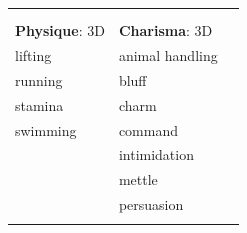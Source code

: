 \documentclass[10pt]{article}
\begin{document}
\begin{table}
\begin{tabular}{m{156pt} m{156pt} m{156pt}}
 \hrulefill &  \hrulefill &  \hrulefill \\

 \hrulefill &  \hrulefill &  \hrulefill \\


\textbf{Physique}: 3D \hrulefill & \textbf{Charisma}: 3D \hrulefill     &  \hrulefill \\

lifting              \hrulefill & animal handling      \hrulefill &  \hrulefill \\

running              \hrulefill & bluff                \hrulefill &  \hrulefill \\

stamina              \hrulefill & charm                \hrulefill &  \hrulefill \\

swimming             \hrulefill & command              \hrulefill &  \hrulefill \\

 \hrulefill & intimidation         \hrulefill &  \hrulefill \\

 \hrulefill & mettle               \hrulefill &  \hrulefill \\

 \hrulefill & persuasion           \hrulefill &  \hrulefill \\

 \hrulefill &  \hrulefill &  \hrulefill \\


\end{tabular}
\end{table}
\end{document}
